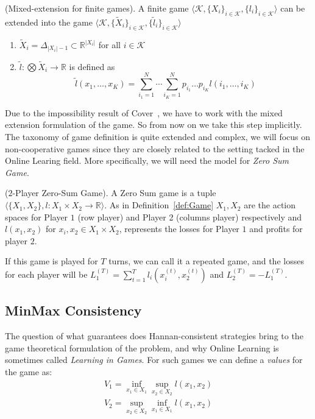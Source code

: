 \begin{definition}(Mixed-extension for finite games).
A finite game $\langle\mathcal K,\{X_i\}_{i\in\mathcal K},\{l_i\}_{i\in\mathcal K}\rangle$ can be extended into the game $\langle\mathcal K,\{\tilde X_i\}_{i\in\mathcal K},\{\tilde l_i\}_{i\in\mathcal K}\rangle$
\begin{enumerate}
	\item $\tilde X_i=\Delta_{|X_i|-1}\subset \mathbb R^{|X_i|}$ for all $i\in\mathcal K$ 
	\item $\tilde l:\bigotimes \tilde X_i\to\mathbb R$ is defined as
	$$\tilde l(x_1,\ldots,x_K)=\sum\limits_{i_1=1}^N\cdots\sum\limits_{i_K=1}^Np_{i_1}\ldots p_{i_K}l(i_1,\ldots,i_K)$$ 
\end{enumerate}
\end{definition}

Due to the impossibility result of Cover~\cite{cover1966behavior}, we have to work with the mixed extension formulation of the game. So from now on we take this step implicitly.
The taxonomy of game definition is quite extended and complex, we will focus on non-cooperative games  since they are closely related to the setting tacked in the Online Learing field. More specifically, we will need the model for \emph{Zero Sum Game}. 

\begin{definition}($2$-Player Zero-Sum Game).\label{def:ZSG}
A Zero Sum game is a tuple $\langle\{X_1,X_2\},l:X_1\times X_2\to\mathbb R\rangle$. As in Definition~\ref{def:Game} $X_1,X_2$ are the action spaces for Player $1$ (row player) and Player 2 (columns player) respectively and $l(x_1,x_2)$ for $x_i,x_2\in X_1\times X_2$, represents the losses for Player $1$ and profits for player $2$.
\end{definition}

If this game is played for $T$ turns, we can call it a repeated game, and the losses for each player will be $L_1^{(T)}=\sum\limits_{t=1}^Tl_i\left(x_i^{(t)},x_2^{(t)}\right)$ and $L_2^{(T)}=-L_1^{(T)}$. 


\subsection{MinMax Consistency}
The question of what guarantees does Hannan-consistent strategies bring to the game theoretical formulation of the problem, and why Online Learning is sometimes called \emph{Learning in Games}.
For such games we can define a \emph{values} for the game as: 
\begin{align}
    V_1=\inf\limits_{x_1\in X_1}\sup\limits_{x_2\in X_2}l(x_1,x_2)\\
	V_2=\sup\limits_{x_2\in X_2}\inf\limits_{x_1\in X_1}l(x_1,x_2)
\end{align}

